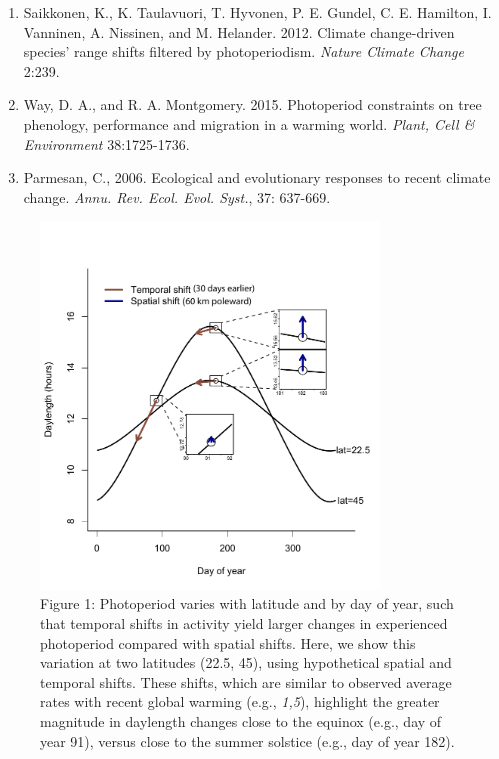 \documentclass[10.5pt,a4paper]{letter}
\begin{document}
\begin{letter}{}
\begin{footnotesize}
\begin{enumerate}
\item Saikkonen, K., K. Taulavuori, T. Hyvonen, P. E. Gundel, C. E. Hamilton, I. Vanninen, A. Nissinen, and M. Helander. 2012. Climate change-driven species' range shifts filtered by photoperiodism. \emph{Nature Climate Change} 2:239.
\item Way, D. A., and R. A. Montgomery. 2015. Photoperiod constraints on tree phenology, performance and migration in a warming world. \emph{Plant, Cell \& Environment} 38:1725-1736.
\item Parmesan, C., 2006. Ecological and evolutionary responses to recent climate change.  \emph{Annu. Rev. Ecol. Evol. Syst.}, 37: 637-669.
\end{enumerate}

\begin{figure}
\includegraphics[width=90mm,scale=0.5]{..//..//analyses/photoperiod/figures/photo_spacetime_v2.pdf} 
\caption{Figure 1: Photoperiod varies with latitude and by day of year, such that temporal shifts in
activity yield larger changes in experienced photoperiod compared with spatial shifts. Here, we show
this variation at two latitudes (22.5\degree, 45\degree), using hypothetical spatial and temporal shifts. These shifts,
which are similar to observed average rates with recent global warming (e.g., \emph{1,5}), highlight the greater magnitude in daylength changes close to the equinox (e.g., day of
year 91), versus close to the summer solstice (e.g., day of year 182).}
 \label{fig:condiag}
 \end{figure}
 

\end{footnotesize}
\end{letter}
\end{document}

